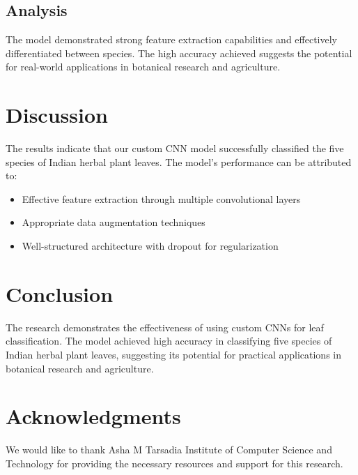 \documentclass[twocolumn]{article}
\begin{document}
\subsection{Analysis}
The model demonstrated strong feature extraction capabilities and effectively differentiated between species. The high accuracy achieved suggests the potential for real-world applications in botanical research and agriculture.

\section{Discussion}
The results indicate that our custom CNN model successfully classified the five species of Indian herbal plant leaves. The model's performance can be attributed to:
\begin{itemize}\itemsep4pt
    \item Effective feature extraction through multiple convolutional layers
    \item Appropriate data augmentation techniques
    \item Well-structured architecture with dropout for regularization
\end{itemize}

\section{Conclusion}
The research demonstrates the effectiveness of using custom CNNs for leaf classification. The model achieved high accuracy in classifying five species of Indian herbal plant leaves, suggesting its potential for practical applications in botanical research and agriculture.

\section*{Acknowledgments}
We would like to thank Asha M Tarsadia Institute of Computer Science and Technology for providing the necessary resources and support for this research.



\end{document}
